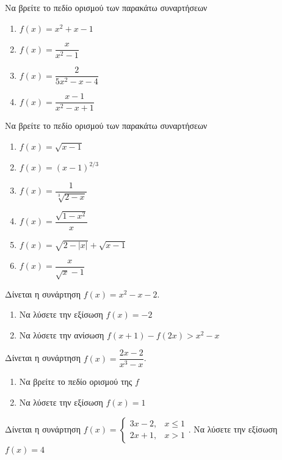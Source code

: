 \documentclass{presentation}
\begin{document}
\begin{askisi}
  Να βρείτε το πεδίο ορισμού των παρακάτω συναρτήσεων
  \begin{enumerate}[<+->]
    \item $f(x)=x^2+x-1$
    \item $f(x)=\dfrac{x}{x^2-1}$
    \item $f(x)=\dfrac{2}{5x^2-x-4}$
    \item $f(x)=\dfrac{x-1}{x^2-x+1}$
  \end{enumerate}
\end{askisi}

\begin{askisi}
  Να βρείτε το πεδίο ορισμού των παρακάτω συναρτήσεων
  \begin{enumerate}[<+->]
    \item $f(x)=\sqrt{x-1}$
    \item $f(x)=(x-1)^{2/3}$
    \item $f(x)=\dfrac{1}{\sqrt[3]{2-x}}$
    \item $f(x)=\dfrac{\sqrt{1-x^2}}{x}$
    \item $f(x)=\sqrt{2-|x|}+\sqrt{x-1}$
    \item $f(x)=\dfrac{x}{\sqrt{x}-1}$
  \end{enumerate}
\end{askisi}

\begin{askisi}
  Δίνεται η συνάρτηση $f(x)=x^2-x-2$.
  \begin{enumerate}[<+->]
    \item Να λύσετε την εξίσωση $f(x)=-2$
    \item Να λύσετε την ανίσωση $f(x+1)-f(2x)>x^2-x$
  \end{enumerate}
\end{askisi}

\begin{askisi}
  Δίνεται η συνάρτηση $f(x)=\dfrac{2x-2}{x^3-x}$.
  \begin{enumerate}[<+->]
    \item Να βρείτε το πεδίο ορισμού της $f$
    \item Να λύσετε την εξίσωση $f(x)=1$
  \end{enumerate}
\end{askisi}

\begin{askisi}
  Δίνεται η συνάρτηση $f(x)=\begin{cases}
      3x-2, & x\le 1 \\
      2x+1, & x>1
    \end{cases}$. Να λύσετε την εξίσωση $f(x)=4$
\end{askisi}
\end{document}
